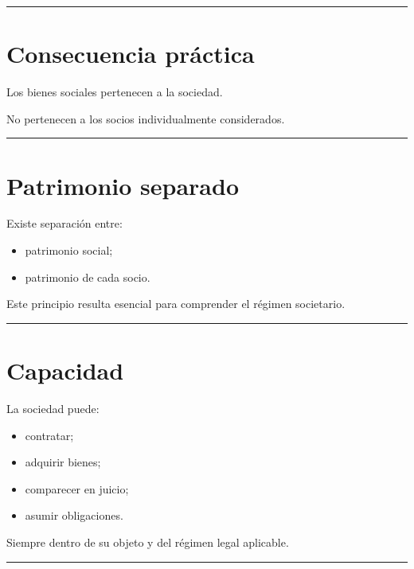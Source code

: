\documentclass[
  spanish,
  letterpaper,
  DIV=11,
  numbers=noendperiod]{scrartcl}
\providecommand{\tightlist}{%
  \setlength{\itemsep}{0pt}\setlength{\parskip}{0pt}}
\begin{document}
\begin{center}\rule{0.5\linewidth}{0.5pt}\end{center}

\section{Consecuencia práctica}\label{consecuencia-pruxe1ctica}

Los bienes sociales pertenecen a la sociedad.

No pertenecen a los socios individualmente considerados.

\begin{center}\rule{0.5\linewidth}{0.5pt}\end{center}

\section{Patrimonio separado}\label{patrimonio-separado}

Existe separación entre:

\begin{itemize}
\tightlist
\item
  patrimonio social;
\item
  patrimonio de cada socio.
\end{itemize}

Este principio resulta esencial para comprender el régimen societario.

\begin{center}\rule{0.5\linewidth}{0.5pt}\end{center}

\section{Capacidad}\label{capacidad}

La sociedad puede:

\begin{itemize}
\tightlist
\item
  contratar;
\item
  adquirir bienes;
\item
  comparecer en juicio;
\item
  asumir obligaciones.
\end{itemize}

Siempre dentro de su objeto y del régimen legal aplicable.

\begin{center}\rule{0.5\linewidth}{0.5pt}\end{center}
\end{document}
